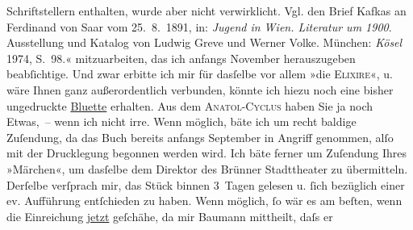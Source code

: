 \begin{ledgroupsized}[t]{13cm}
{{{                  Schriftstellern enthalten, wurde aber nicht verwirklicht. Vgl. den Brief Kafkas an Ferdinand von Saar vom 25. 8. 1891, in: \emph{Jugend in Wien. Literatur um 1900}. Ausstellung und
                     Katalog von Ludwig Greve und Werner Volke. München:
                        \emph{Kösel}{ }1974, S. 98.}}}\label{K_L00037_1h}« mitzuarbeiten, das ich anfangs
                  November herauszugeben beabſichtige. Und zwar erbitte ich mir für
               dasſelbe vor allem »die \textsc{Elixire}«, u. wäre Ihnen ganz außerordentlich verbunden, könnte ich hiezu noch eine
               bisher ungedruckte \uline{Bluette} erhalten. Aus dem \textsc{Anatol-Cyclus} haben Sie ja noch Etwas, – wenn ich nicht irre. Wenn möglich, bäte ich um recht
               baldige Zuſendung, da das Buch bereits anfangs September in Angriff genommen, alſo
               mit der Drucklegung begonnen werden wird.\pend
           \pstart
           Ich bäte ferner um Zuſendung Ihres »Märchen«, um
               dasſelbe dem Direktor des
               Brünner Stadttheater zu übermit{\pb}teln. Derſelbe verſprach mir, das Stück binnen 3 Tagen
               gelesen u. ſich bezüglich einer ev. Aufführung entſchieden zu haben. Wenn möglich, ſo
               wär es am beſten, wenn die Einreichung \uline{jetzt}
               geſchähe, da mir Baumann mittheilt, daſs er

\end{ledgroupsized}
